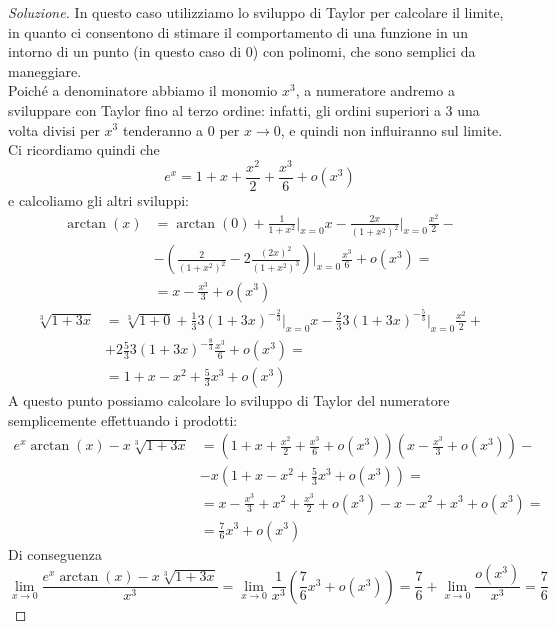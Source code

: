 \begin{proof}[Soluzione]
    In questo caso utilizziamo lo sviluppo di Taylor per calcolare il limite, in quanto ci consentono di stimare il comportamento di una funzione in un intorno di un punto (in questo caso di 0) con polinomi, che sono semplici da maneggiare.\\
    Poiché a denominatore abbiamo il monomio $x^3$, a numeratore andremo a sviluppare con Taylor fino al terzo ordine: infatti, gli ordini superiori a 3 una volta divisi per $x^3$ tenderanno a $0$ per $x\to 0$, e quindi non influiranno sul limite. Ci ricordiamo quindi che 
    \[
    e^x = 1 + x + \frac{x^2}{2}+\frac{x^3}{6}+o(x^3)
    \]
    e calcoliamo gli altri sviluppi:
    \[
    \begin{split}
        \arctan(x) & = \arctan(0)+\frac{1}{1+x^2}\bigg|_{x=0}x -\frac{2x}{(1+x^2)^2}\bigg|_{x=0}\frac{x^2}{2}-\\
        & - \left(\frac{2}{(1+x^2)^2}-2\frac{(2x)^2}{(1+x^2)^3}\right)\bigg|_{x=0}\frac{x^3}{6}+o(x^3) = \\
        & = x-\frac{x^3}{3}+o(x^3)
    \end{split}
    \]
    \[
    \begin{split}
        \sqrt[3]{1+3x} & = \sqrt[3]{1+0}+\frac{1}{3}3(1+3x)^{-\frac{2}{3}}\bigg|_{x=0}x -\frac{2}{3}3(1+3x)^{-\frac{5}{3}}\bigg|_{x=0}\frac{x^2}{2}+\\
        & + 2\frac{5}{3}3(1+3x)^{-\frac{8}{3}}\frac{x^3}{6}+o(x^3) = \\
        & = 1 + x-x^2 + \frac{5}{3}x^3+o(x^3)
    \end{split}
    \]
    A questo punto possiamo calcolare lo sviluppo di Taylor del numeratore semplicemente effettuando i prodotti:
    \[
    \begin{split}
        e^x\arctan(x)-x\sqrt[3]{1+3x} & = \left(1+x+\frac{x^2}{2}+\frac{x^3}{6}+o(x^3)\right)\left(x-\frac{x^3}{3}+o(x^3)\right)-\\
        & - x\left(1+x-x^2+\frac{5}{3}x^3+o(x^3)\right) = \\
        & = x-\frac{x^3}{3}+x^2 + \frac{x^3}{2} + o(x^3)-x-x^2+x^3+o(x^3) =\\
        & = \frac{7}{6}x^3+o(x^3)
    \end{split}
    \]
    Di conseguenza
    \[
    \lim_{x\to 0} \frac{e^x\arctan(x)-x\sqrt[3]{1+3x}}{x^3} = \lim_{x\to 0} \frac{1}{x^3}\left(\frac{7}{6}x^3 +o(x^3)\right) = \frac{7}{6} +\lim_{x\to 0}\frac{o(x^3)}{x^3} = \frac{7}{6}
    \]
\end{proof}
\newpage
